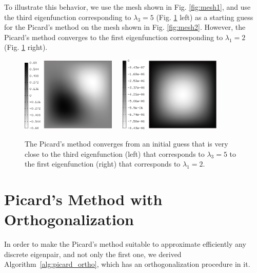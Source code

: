 \documentclass[preprint,12pt]{elsarticle}
\begin{document}
To illustrate this behavior, we use the mesh shown in Fig. \ref{fig:mesh1}, and use 
the third eigenfunction corresponding to $\lambda_3 = 5$ (Fig. \ref{fig:picard} left) 
as a starting guess for the Picard's method on the mesh shown in Fig. \ref{fig:mesh2}.
However, the Picard's method converges to the first eigenfunction corresponding 
to $\lambda_1 = 2$ (Fig. \ref{fig:picard} right).

\newpage

\begin{figure}[!ht]
\begin{center}
\includegraphics[width=0.4\textwidth]{img/eigen_2.png}\ \ \ 
\includegraphics[width=0.433\textwidth]{img/eigen-new-1.png}
\end{center}
\vspace{-5mm}
\caption{The Picard's method converges from an initial guess that is very close to 
         the third eigenfunction (left) that corresponds to $\lambda_3 = 5$ to the 
         first eigenfunction (right) that corresponds to $\lambda_1 = 2$.}
\label{fig:picard}
\end{figure}


\section{Picard's Method with Orthogonalization}\label{sec:picard++}

In order to make the Picard's method suitable to approximate efficiently any discrete eigenpair, and not only the first one, we derived Algorithm~\ref{alg:picard_ortho}, which has an orthogonalization procedure in it.
\end{document}
